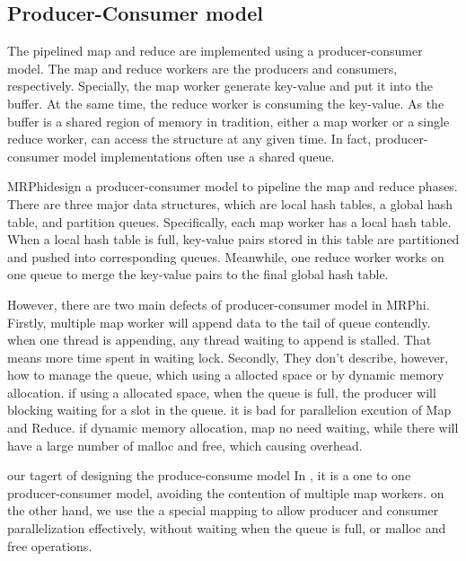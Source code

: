 

\subsection{Producer-Consumer model}
The pipelined map and reduce are implemented using a
producer-consumer model. 
The map and reduce workers are the producers and consumers, respectively.
Specially, the map worker generate key-value and 
put it into the buffer.
At the same time, 
the reduce worker is consuming the key-value.
As the buffer is a shared region of memory in tradition,
either a map worker or a single reduce worker,
can access the structure at any given time.
In fact, producer-consumer model implementations
often use a shared queue.

MRPhi\cite{lu2013mrphi}design a producer-consumer model 
to pipeline the map and reduce phases. 
There are three major data structures, 
which are local hash tables, a global hash table, 
and partition queues. 
Specifically, each map worker has a local hash table. 
When a local hash table is full,
key-value pairs stored in this table are partitioned and
pushed into corresponding queues. 
Meanwhile, one reduce
worker works on one queue to merge the key-value pairs to
the final global hash table.

However, there are two main defects of producer-consumer model in MRPhi.
Firstly, multiple map worker will append data to the tail of queue {\color{gray}contendly}. 
when one thread is appending, any thread waiting to append is stalled.
That means more time spent in waiting lock.
Secondly, They don’t describe, however, how to manage the queue,
which using a allocted space or by dynamic memory allocation.
if using a allocated space, when the queue is full, 
the producer will blocking waiting for a slot in the queue.
it is bad for parallelion excution of Map and Reduce.
if dynamic memory allocation, 
map no need waiting, while there will have a large number of malloc and free,
which causing overhead.

{\color{red} our tagert of designing the produce-consume model}
In \myds, it is a one to one producer-consumer model, 
avoiding the contention of multiple map workers.
on the other hand,
we use the a special mapping to allow producer and consumer parallelization effectively, without waiting when the queue is full, or malloc and free operations.

